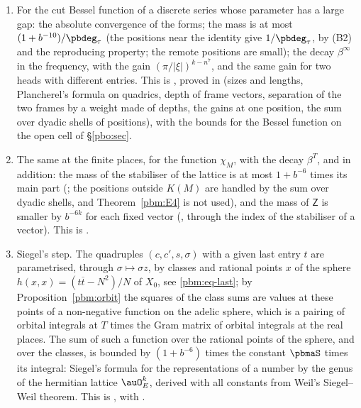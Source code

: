 \documentclass[10pt]{amsart}
\theoremstyle{definition}
\theoremstyle{remark}
\providecommand{\aubar}[1]{\overline{#1}}
\begin{document}
\begin{enumerate}
\item[(R)] For the cut Bessel function of a discrete series whose parameter has a large gap: the
absolute convergence of the forms; the mass is at most $(1+b^{-10})/\pbdeg_\tau$ (the positions near the
identity give $1/\pbdeg_\tau$, by (B2) and the reproducing property; the remote positions are small);
the decay $\beta^\infty$ in the frequency, with the gain $(\pi/|\xi|)^{k-n^7}$, and the same gain for two
heads with different entries. This is {\cite[Theorem~2.17]{P52}}, proved in {\cite[\S\S2, 3 and~4]{P52}} (sizes and lengths, Plancherel's formula on quadrics, depth of frame vectors, separation
of the two frames by a weight made of depths, the gains at one position, the sum over dyadic shells
of positions), with the bounds for the Bessel function on the open cell of \S\ref{pbo:sec}.
\item[(F)] The same at the finite places, for the function $\chi_M$, with the decay $\beta^T$, and
in addition: the mass of the stabiliser of the lattice is at most $1+b^{-6}$ times its main part
({\cite[Corollary~5.12]{P52}}; the positions outside $K(M)$ are handled by the sum over dyadic shells, and
Theorem~\ref{pbm:E4} is not used), and the mass of $\mathsf Z$ is smaller by $b^{-6k}$ for each fixed
vector ({\cite[Theorem~5.24]{P52}}, through the index of the stabiliser of a vector). This is
{\cite[Theorem~5.28]{P52}}.
\item[(S)] Siegel's step. The quadruples $(c,c',s,\sigma)$ with a given last entry $t$ are
parametrised, through $\sigma\mapsto\sigma z$, by classes and rational points $x$ of the sphere
$h(x,x)=(t\aubar t-N^2)/N$ of $X_0$, see \eqref{pbm:eq-last}; by Proposition~\ref{pbm:orbit} the
squares of the class sums are values at these points of a non-negative function on the adelic
sphere, which is a pairing of orbital integrals at $T$ times the Gram matrix of orbital integrals
at the real places. The sum of such a function over the rational points of the sphere, and over the
classes, is bounded by $(1+b^{-6})$ times the constant $\pbmaS$ times its integral: Siegel's formula
for the representations of a number by the genus of the hermitian lattice $\auO_E^k$, derived with
all constants from Weil's Siegel--Weil theorem. This is {\cite[Theorem~5.29]{P52}}, with
{\cite[Proposition~6.35]{P52}}.
\end{enumerate}
\end{document}
